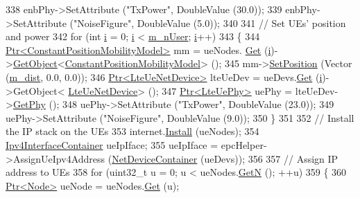 \begin{DoxyCode}
338   enbPhy->SetAttribute (\textcolor{stringliteral}{"TxPower"}, DoubleValue (30.0));
339   enbPhy->SetAttribute (\textcolor{stringliteral}{"NoiseFigure"}, DoubleValue (5.0));
340 
341   \textcolor{comment}{// Set UEs' position and power}
342   \textcolor{keywordflow}{for} (\textcolor{keywordtype}{int} \hyperlink{bernuolliDistribution_8m_a6f6ccfcf58b31cb6412107d9d5281426}{i} = 0; \hyperlink{bernuolliDistribution_8m_a6f6ccfcf58b31cb6412107d9d5281426}{i} < \hyperlink{classLenaCqaFfMacSchedulerTestCase1_a30de491612daf3ae61a52937b2aa0cc8}{m\_nUser}; \hyperlink{bernuolliDistribution_8m_a6f6ccfcf58b31cb6412107d9d5281426}{i}++)
343     \{
344       \hyperlink{classns3_1_1Ptr}{Ptr<ConstantPositionMobilityModel>} mm = ueNodes.
      \hyperlink{classns3_1_1NodeContainer_a9ed96e2ecc22e0f5a3d4842eb9bf90bf}{Get} (\hyperlink{bernuolliDistribution_8m_a6f6ccfcf58b31cb6412107d9d5281426}{i})->\hyperlink{classns3_1_1Object_a13e18c00017096c8381eb651d5bd0783}{GetObject}<\hyperlink{classns3_1_1ConstantPositionMobilityModel}{ConstantPositionMobilityModel}> ();
345       mm->\hyperlink{classns3_1_1MobilityModel_ac584b3d5a309709d2f13ed6ada1e7640}{SetPosition} (Vector (\hyperlink{classLenaCqaFfMacSchedulerTestCase1_a21bc608b208134468db88788c108a6d9}{m\_dist}, 0.0, 0.0));
346       \hyperlink{classns3_1_1Ptr}{Ptr<LteUeNetDevice>} lteUeDev = ueDevs.\hyperlink{classns3_1_1NetDeviceContainer_a677d62594b5c9d2dea155cc5045f4d0b}{Get} (\hyperlink{bernuolliDistribution_8m_a6f6ccfcf58b31cb6412107d9d5281426}{i})->GetObject<
      \hyperlink{classns3_1_1LteUeNetDevice}{LteUeNetDevice}> ();
347       \hyperlink{classns3_1_1Ptr}{Ptr<LteUePhy>} uePhy = lteUeDev->\hyperlink{classns3_1_1LteUeNetDevice_a2a9940a1e457a8bf3dae87fed4199c7a}{GetPhy} ();
348       uePhy->SetAttribute (\textcolor{stringliteral}{"TxPower"}, DoubleValue (23.0));
349       uePhy->SetAttribute (\textcolor{stringliteral}{"NoiseFigure"}, DoubleValue (9.0));
350     \}
351 
352   \textcolor{comment}{// Install the IP stack on the UEs}
353   internet.\hyperlink{classns3_1_1InternetStackHelper_a6645b412f31283d2d9bc3d8a95cebbc0}{Install} (ueNodes);
354   \hyperlink{classns3_1_1Ipv4InterfaceContainer}{Ipv4InterfaceContainer} ueIpIface;
355   ueIpIface = epcHelper->AssignUeIpv4Address (\hyperlink{classns3_1_1NetDeviceContainer}{NetDeviceContainer} (ueDevs));
356 
357   \textcolor{comment}{// Assign IP address to UEs}
358   \textcolor{keywordflow}{for} (uint32\_t u = 0; u < ueNodes.\hyperlink{classns3_1_1NodeContainer_aed647ac56d0407a7706aba02eb44b951}{GetN} (); ++u)
359     \{
360       \hyperlink{classns3_1_1Ptr}{Ptr<Node>} ueNode = ueNodes.\hyperlink{classns3_1_1NodeContainer_a9ed96e2ecc22e0f5a3d4842eb9bf90bf}{Get} (u);

\end{DoxyCode}
